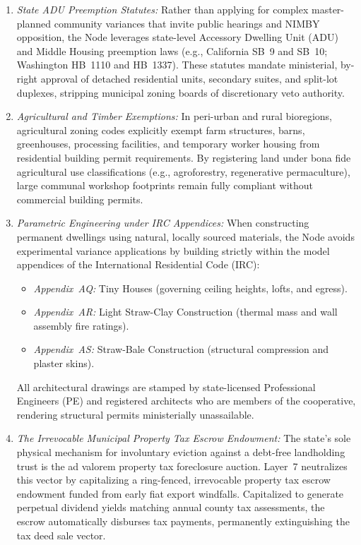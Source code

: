 \begin{enumerate}
  \item \textit{State ADU Preemption Statutes:} Rather than applying for complex master-planned community variances that invite public hearings and NIMBY opposition, the Node leverages state-level Accessory Dwelling Unit (ADU) and Middle Housing preemption laws (e.g., California SB~9 and SB~10; Washington HB~1110 and HB~1337). These statutes mandate ministerial, by-right approval of detached residential units, secondary suites, and split-lot duplexes, stripping municipal zoning boards of discretionary veto authority.
  \item \textit{Agricultural and Timber Exemptions:} In peri-urban and rural bioregions, agricultural zoning codes explicitly exempt farm structures, barns, greenhouses, processing facilities, and temporary worker housing from residential building permit requirements. By registering land under bona fide agricultural use classifications (e.g., agroforestry, regenerative permaculture), large communal workshop footprints remain fully compliant without commercial building permits.
  \item \textit{Parametric Engineering under IRC Appendices:} When constructing permanent dwellings using natural, locally sourced materials, the Node avoids experimental variance applications by building strictly within the model appendices of the International Residential Code (IRC):
    \begin{itemize}
      \item \textit{Appendix~AQ:} Tiny Houses (governing ceiling heights, lofts, and egress).
      \item \textit{Appendix~AR:} Light Straw-Clay Construction (thermal mass and wall assembly fire ratings).
      \item \textit{Appendix~AS:} Straw-Bale Construction (structural compression and plaster skins).
    \end{itemize}
    All architectural drawings are stamped by state-licensed Professional Engineers (PE) and registered architects who are members of the cooperative, rendering structural permits ministerially unassailable.
  \item \textit{The Irrevocable Municipal Property Tax Escrow Endowment:} The state's sole physical mechanism for involuntary eviction against a debt-free landholding trust is the ad valorem property tax foreclosure auction. Layer~7 neutralizes this vector by capitalizing a ring-fenced, irrevocable property tax escrow endowment funded from early fiat export windfalls. Capitalized to generate perpetual dividend yields matching annual county tax assessments, the escrow automatically disburses tax payments, permanently extinguishing the tax deed sale vector.

\end{enumerate}
